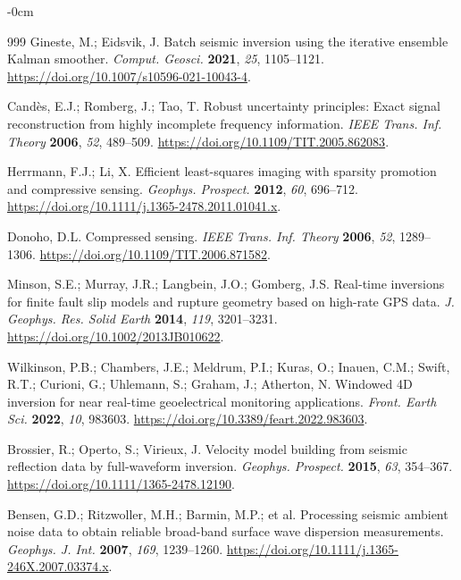 \documentclass[data,article,accept,pdftex,moreauthors]{Definitions/mdpi}
\begin{document}
\begin{adjustwidth}{-\extralength}{0cm}
\begin{thebibliography}{999}
Gineste, M.; Eidsvik, J. Batch seismic inversion using the iterative ensemble Kalman smoother. \emph{Comput. Geosci.} \textbf{2021}, \emph{25}, 1105--1121. \url{https://doi.org/10.1007/s10596-021-10043-4}.

Candès, E.J.; Romberg, J.; Tao, T. Robust uncertainty principles: Exact signal reconstruction from highly incomplete frequency information. \emph{IEEE Trans. Inf. Theory} \textbf{2006}, \emph{52}, 489--509. \url{https://doi.org/10.1109/TIT.2005.862083}.

Herrmann, F.J.; Li, X. Efficient least-squares imaging with sparsity promotion and compressive sensing. \emph{Geophys. Prospect.} \textbf{2012}, \emph{60}, 696--712. \url{https://doi.org/10.1111/j.1365-2478.2011.01041.x}.

Donoho, D.L. Compressed sensing. \emph{IEEE Trans. Inf. Theory} \textbf{2006}, \emph{52}, 1289--1306. \url{https://doi.org/10.1109/TIT.2006.871582}.

Minson, S.E.; Murray, J.R.; Langbein, J.O.; Gomberg, J.S. Real-time inversions for finite fault slip models and rupture geometry based on high-rate GPS data. \emph{J. Geophys. Res. Solid Earth} \textbf{2014}, \emph{119}, 3201--3231. \url{https://doi.org/10.1002/2013JB010622}.

Wilkinson, P.B.; Chambers, J.E.; Meldrum, P.I.; Kuras, O.; Inauen, C.M.; Swift, R.T.; Curioni, G.; Uhlemann, S.; Graham, J.; Atherton, N. Windowed 4D inversion for near real-time geoelectrical monitoring applications. \emph{Front. Earth Sci.} \textbf{2022}, \emph{10}, 983603. \url{https://doi.org/10.3389/feart.2022.983603}.

Brossier, R.; Operto, S.; Virieux, J. Velocity model building from seismic reflection data by full-waveform inversion. \emph{Geophys. Prospect.} \textbf{2015}, \emph{63}, 354--367. \url{https://doi.org/10.1111/1365-2478.12190}.

Bensen, G.D.; Ritzwoller, M.H.; Barmin, M.P.; et al. Processing seismic ambient noise data to obtain reliable broad-band surface wave dispersion measurements. \emph{Geophys. J. Int.} \textbf{2007}, \emph{169}, 1239--1260. \url{https://doi.org/10.1111/j.1365-246X.2007.03374.x}.


\end{thebibliography}
\end{adjustwidth}
\end{document}
